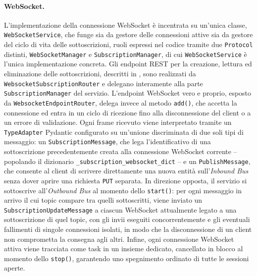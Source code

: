 \paragraph{WebSocket.}
L'implementazione della connessione WebSocket è incentrata su un'unica classe, \texttt{WebSocketService}, che funge sia da gestore delle connessioni attive sia da gestore del ciclo di vita delle sottoscrizioni, ruoli espressi nel codice tramite due \texttt{Protocol} distinti, \texttt{WebSocketManager} e \texttt{SubscriptionManager}, di cui \texttt{WebSocketService} è l'unica implementazione concreta. Gli endpoint \ac{REST} per la creazione, lettura ed eliminazione delle sottoscrizioni, descritti in , sono realizzati da \texttt{WebsocketSubscriptionRouter} e delegano interamente alla parte \texttt{SubscriptionManager} del servizio. L'endpoint WebSocket vero e proprio, esposto da \texttt{WebsocketEndpointRouter}, delega invece al metodo \texttt{add()}, che accetta la connessione ed entra in un ciclo di ricezione fino alla disconnessione del client o a un errore di validazione. Ogni frame ricevuto viene interpretato tramite un \texttt{TypeAdapter} Pydantic configurato su un'unione discriminata di due soli tipi di messaggio: un \texttt{SubscriptionMessage}, che lega l'identificativo di una sottoscrizione precedentemente creata alla connessione WebSocket corrente -- popolando il dizionario \texttt{\_subscription\_websocket\_dict} -- e un \texttt{PublishMessage}, che consente al client di scrivere direttamente una nuova entità sull'\textit{Inbound Bus} senza dover aprire una richiesta \texttt{PUT} separata. In direzione opposta, il servizio si sottoscrive all'\textit{Outbound Bus} al momento dello \texttt{start()}: per ogni messaggio in arrivo il cui topic compare tra quelli sottoscritti, viene inviato un \texttt{SubscriptionUpdateMessage} a ciascun WebSocket attualmente legato a una sottoscrizione di quel topic, con gli invii eseguiti concorrentemente e gli eventuali fallimenti di singole connessioni isolati, in modo che la disconnessione di un client non comprometta la consegna agli altri. Infine, ogni connessione WebSocket attiva viene tracciata come task in un insieme dedicato, cancellato in blocco al momento dello \texttt{stop()}, garantendo uno spegnimento ordinato di tutte le sessioni aperte.
%